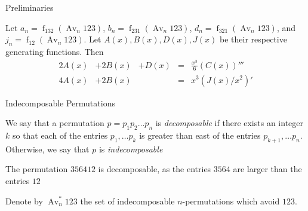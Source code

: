 \documentclass[xcolor=dvipsnames]{beamer}
\newcommand{\Avns}{\Av_n ^* 123 }
\newcommand{\Avn}{\Av_n   123 }
\DeclareMathOperator{\Av}{Av}
\DeclareMathOperator{\num}{f}
\theoremstyle{definition}            %
\begin{document}
\begin{frame}{Preliminaries}
  \begin{lemma}
    Let $a_n = \num_{132}(\Avn)$, $b_n = \num_{231}(\Avn)$, $d_n =
    \num_{321}(\Avn)$, and $j_n = \num_{12}(\Avn)$. Let $A(x), B(x),
    D(x), J(x)$ be their respective generating functions. Then 
    $$ \begin{array}{ccccc}
      2A(x) & + 2B(x) & + D(x) & = & \frac{x^3}{6} (C(x))''' \\
      4A(x) & + 2B(x) & & =&  x^3(J(x)/x^2)' 
      \end{array} $$
  \end{lemma}

\end{frame}
  

\begin{frame}{Indecomposable Permutations}
  
  \begin{definition}
    We say that a permutation $p = p_1 p_2 \ldots p_n$ is
    \emph{decomposable} if there exists an integer $k$ so that each
    of the entries $p_1, \ldots p_k$ is greater than east of the
    entries $p_{k+1}, \ldots p_n$. Otherwise, we say that $p$ is
    \emph{indecomposable}
  \end{definition}

  \pause

  \begin{example}
    The permutation $3 5 6 4 1 2$ is decomposable, as the entries
    $3564$ are larger than the entries $12$
  \end{example}

  \pause

  \begin{definition}
    Denote by $\Avns$ the set of indecomposable $n$-permutations which
    avoid $123$.
  \end{definition}

\end{frame}
\end{document}
